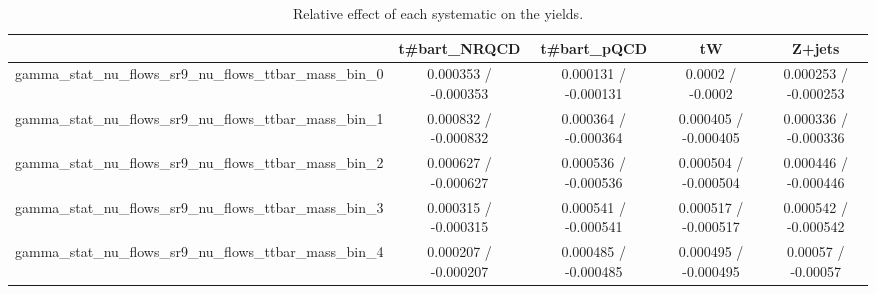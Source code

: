\documentclass[10pt]{article}
\begin{document}
\begin{table}[htbp]
\begin{center}
\begin{tabular}{|c|c|c|c|c|}
\hline 
      & t#bar{t}_{NRQCD}      & t#bar{t}_{pQCD}      & tW      & Z+jets \\ 
\hline 
  gamma_stat_nu_flows_sr9_nu_flows_ttbar_mass_bin_0 & 0.000353 / -0.000353 & 0.000131 / -0.000131 & 0.0002 / -0.0002 & 0.000253 / -0.000253 \\ 
  gamma_stat_nu_flows_sr9_nu_flows_ttbar_mass_bin_1 & 0.000832 / -0.000832 & 0.000364 / -0.000364 & 0.000405 / -0.000405 & 0.000336 / -0.000336 \\ 
  gamma_stat_nu_flows_sr9_nu_flows_ttbar_mass_bin_2 & 0.000627 / -0.000627 & 0.000536 / -0.000536 & 0.000504 / -0.000504 & 0.000446 / -0.000446 \\ 
  gamma_stat_nu_flows_sr9_nu_flows_ttbar_mass_bin_3 & 0.000315 / -0.000315 & 0.000541 / -0.000541 & 0.000517 / -0.000517 & 0.000542 / -0.000542 \\ 
  gamma_stat_nu_flows_sr9_nu_flows_ttbar_mass_bin_4 & 0.000207 / -0.000207 & 0.000485 / -0.000485 & 0.000495 / -0.000495 & 0.00057 / -0.00057 \\ 
\hline 
\end{tabular} 
\caption{Relative effect of each systematic on the yields.} 
\end{center} 
\end{table} 
\end{document}
